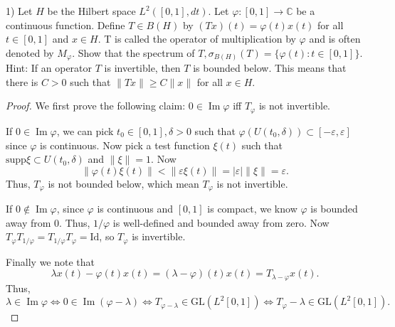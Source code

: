 
\begin{problem}
	1) Let $H$ be the Hilbert space $L^2([0,1], d t)$. Let $\varphi:[0,1] \rightarrow \mathbb{C}$ be a continuous function. Define $T \in B(H)$ by $(T x)(t)=\varphi(t) x(t)$ for all $t \in[0,1]$ and $x \in H$. T is called the operator of multiplication by $\varphi$ and is often denoted by $M_{\varphi}$.
Show that the spectrum of $T, \sigma_{B(H)}(T)=\{\varphi(t): t \in[0,1]\}$.
Hint: If an operator $T$ is invertible, then $T$ is bounded below. This means that there is $C>0$ such that $\|T x\| \geq C\|x\|$ for all $x \in H$.
\end{problem}
\begin{proof}
	We first prove the following claim: $0 \in \operatorname{Im} \varphi$ iff $T_\varphi$ is not invertible.

	If $0 \in \operatorname{Im} \varphi$, we can pick $t_0 \in [0,1], \delta > 0$ such that $\varphi(U(t_0, \delta)) \subset [-\varepsilon, \varepsilon]$ since $\varphi$ is continuous. Now pick a test function $\xi(t)$ such that $\text{supp} \xi \subset U(t_0, \delta)$ and $\|\xi\| = 1$. Now
	\[
		\|\varphi(t) \xi(t)\|< \|\varepsilon \xi(t)\| = |\varepsilon| \|\xi\| = \varepsilon
	.\] 
	Thus, $T_\varphi$ is not bounded below, which mean $T_\varphi$ is not invertible.

	If $0 \not\in \operatorname{Im} \varphi$, since $\varphi$ is continuous and $[0,1]$ is compact, we know $\varphi$ is bounded away from $0$. Thus, $1/\varphi$ is well-defined and bounded away from zero. Now $T_\varphi T_{1 / \varphi} = T_{1 / \varphi} T_\varphi = \text{Id}$, so $T_\varphi$ is invertible.

	Finally we note that
	\[
		\lambda x(t) - \varphi(t) x(t) = (\lambda - \varphi)(t) x\left( t \right)  = T_{\lambda - \varphi} x(t)
	.\] 
	Thus,
	\[
		\lambda \in \operatorname{Im} \varphi \iff 0 \in \operatorname{Im} (\varphi - \lambda) \iff
		T_{\varphi - \lambda} \in \text{GL}(L^2[0,1])
		\iff  
		T_{\varphi }- \lambda \in \text{GL}(L^2[0,1])
	.\]
\end{proof}


